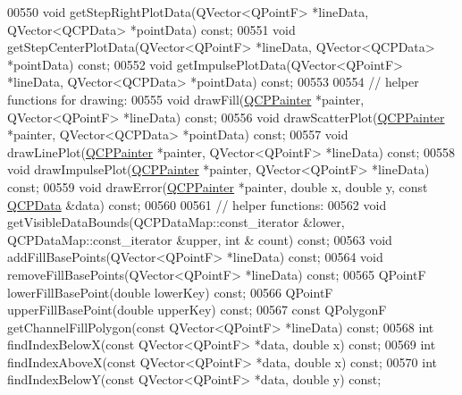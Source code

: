 \begin{DoxyCode}
00550   \textcolor{keywordtype}{void} getStepRightPlotData(QVector<QPointF> *lineData, QVector<QCPData> *pointData) \textcolor{keyword}{const};
00551   \textcolor{keywordtype}{void} getStepCenterPlotData(QVector<QPointF> *lineData, QVector<QCPData> *pointData) \textcolor{keyword}{const};
00552   \textcolor{keywordtype}{void} getImpulsePlotData(QVector<QPointF> *lineData, QVector<QCPData> *pointData) \textcolor{keyword}{const};
00553   
00554   \textcolor{comment}{// helper functions for drawing:}
00555   \textcolor{keywordtype}{void} drawFill(\hyperlink{a00047}{QCPPainter} *painter, QVector<QPointF> *lineData) \textcolor{keyword}{const};
00556   \textcolor{keywordtype}{void} drawScatterPlot(\hyperlink{a00047}{QCPPainter} *painter, QVector<QCPData> *pointData) \textcolor{keyword}{const};
00557   \textcolor{keywordtype}{void} drawLinePlot(\hyperlink{a00047}{QCPPainter} *painter, QVector<QPointF> *lineData) \textcolor{keyword}{const};
00558   \textcolor{keywordtype}{void} drawImpulsePlot(\hyperlink{a00047}{QCPPainter} *painter, QVector<QPointF> *lineData) \textcolor{keyword}{const};
00559   \textcolor{keywordtype}{void} drawError(\hyperlink{a00047}{QCPPainter} *painter, \textcolor{keywordtype}{double} x, \textcolor{keywordtype}{double} y, \textcolor{keyword}{const} 
      \hyperlink{a00030_d2/d94/a00184}{QCPData} &data) \textcolor{keyword}{const};
00560   
00561   \textcolor{comment}{// helper functions:}
00562   \textcolor{keywordtype}{void} getVisibleDataBounds(QCPDataMap::const\_iterator &lower, QCPDataMap::const\_iterator &upper, \textcolor{keywordtype}{int} &
      count) \textcolor{keyword}{const};
00563   \textcolor{keywordtype}{void} addFillBasePoints(QVector<QPointF> *lineData) \textcolor{keyword}{const};
00564   \textcolor{keywordtype}{void} removeFillBasePoints(QVector<QPointF> *lineData) \textcolor{keyword}{const};
00565   QPointF lowerFillBasePoint(\textcolor{keywordtype}{double} lowerKey) \textcolor{keyword}{const};
00566   QPointF upperFillBasePoint(\textcolor{keywordtype}{double} upperKey) \textcolor{keyword}{const};
00567   \textcolor{keyword}{const} QPolygonF getChannelFillPolygon(\textcolor{keyword}{const} QVector<QPointF> *lineData) \textcolor{keyword}{const};
00568   \textcolor{keywordtype}{int} findIndexBelowX(\textcolor{keyword}{const} QVector<QPointF> *data, \textcolor{keywordtype}{double} x) \textcolor{keyword}{const};
00569   \textcolor{keywordtype}{int} findIndexAboveX(\textcolor{keyword}{const} QVector<QPointF> *data, \textcolor{keywordtype}{double} x) \textcolor{keyword}{const};
00570   \textcolor{keywordtype}{int} findIndexBelowY(\textcolor{keyword}{const} QVector<QPointF> *data, \textcolor{keywordtype}{double} y) \textcolor{keyword}{const};

\end{DoxyCode}
